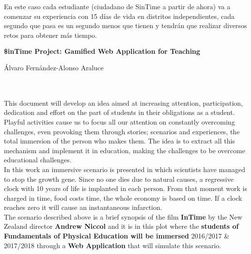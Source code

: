 En este caso cada estudiante (ciudadano de SinTime a partir de ahora) va a comenzar su experiencia con 15 días de vida en distritos independientes, cada segundo que pasa es un segundo menos que tienen y tendrán que realizar diversos retos para obtener más tiempo.

\cleardoublepage


\thispagestyle{empty}


\begin{center}
{\large\bfseries \$inTime Project: Gamified Web Application for Teaching}\\
\end{center}
\begin{center}
Álvaro Fernández-Alonso Araluce\\
\end{center}

\\

\vspace{0.7cm}
\\

This document will develop an idea aimed at increasing attention, participation, dedication and effort on the part of students in their obligations as a student.\\

Playful activities cause us to focus all our attention on constantly overcoming challenges, even provoking them through stories; scenarios and experiences, the total immersion of the person who makes them. The idea is to extract all this mechanism and implement it in education, making the challenges to be overcome educational challenges. \\

In this work an immersive scenario is presented in which scientists have managed to stop the growth gene. Since no one dies due to natural causes, a regressive clock with 10 years of life is implanted in each person. From that moment work is charged in time, food costs time, the whole economy is based on time. If a clock reaches zero it will cause an instantaneous infarction.\\

The scenario described above is a brief synopsis of the film \textbf{InTime} by the New Zealand director \textbf{Andrew Niccol} and it is in this plot where the \textbf{students of Fundamentals of Physical Education will be immersed} 2016/2017  \& 2017/2018 through a \textbf{Web Application} that will simulate this scenario.\\

